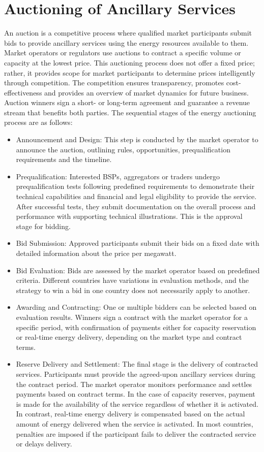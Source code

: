 \section{Auctioning of Ancillary Services}
An auction is a competitive process where qualified market participants submit bids to provide ancillary services using the energy resources available to them. Market operators or regulators use auctions to contract a specific volume or capacity at the lowest price. This auctioning process does not offer a fixed price; rather, it provides scope for market participants to determine prices intelligently through competition. The competition ensures transparency, promotes cost-effectiveness and provides an overview of market dynamics for future business. Auction winners sign a short- or long-term agreement and guarantee a revenue stream that benefits both parties. The sequential stages of the energy auctioning process are as follows:
    \begin{itemize}
        \item Announcement and Design: This step is conducted by the market operator to announce the auction, outlining rules, opportunities, prequalification requirements and the timeline.
        \item Prequalification: Interested BSPs, aggregators or traders undergo prequalification tests following predefined requirements to demonstrate their technical capabilities and financial and legal eligibility to provide the service. After successful tests, they submit documentation on the overall process and performance with supporting technical illustrations. This is the approval stage for bidding.
        \item Bid Submission: Approved participants submit their bids on a fixed date with detailed information about the price per megawatt.
        \item Bid Evaluation: Bids are assessed by the market operator based on predefined criteria. Different countries have variations in evaluation methods, and the strategy to win a bid in one country does not necessarily apply to another.
        \item Awarding and Contracting: One or multiple bidders can be selected based on evaluation results. Winners sign a contract with the market operator for a specific period, with confirmation of payments either for capacity reservation or real-time energy delivery, depending on the market type and contract terms.
        \item Reserve Delivery and Settlement: The final stage is the delivery of contracted services. Participants must provide the agreed-upon ancillary services during the contract period. The market operator monitors performance and settles payments based on contract terms. In the case of capacity reserves, payment is made for the availability of the service regardless of whether it is activated. In contrast, real-time energy delivery is compensated based on the actual amount of energy delivered when the service is activated. In most countries, penalties are imposed if the participant fails to deliver the contracted service or delays delivery.
    \end{itemize}
